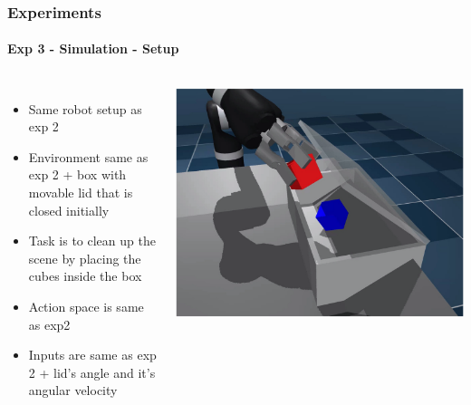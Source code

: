 \documentclass{beamer}
\begin{document}
\begin{frame}
	\frametitle{Experiments}
	\framesubtitle{Exp 3 - Simulation - Setup}
	
	\begin{columns}[c]
		
		
		\begin{itemize}
			\item Same robot setup as exp 2
			\item Environment same as exp 2 + box with movable lid that is closed initially
			\item Task is to clean up the scene by placing the cubes inside the box
			\item Action space is same as exp2
			\item Inputs are same as exp 2 + lid’s angle and it’s angular velocity
		\end{itemize}
		
		\includegraphics[scale=0.2]{sim3.png}
		
	\end{columns}
\end{frame}
\end{document}
